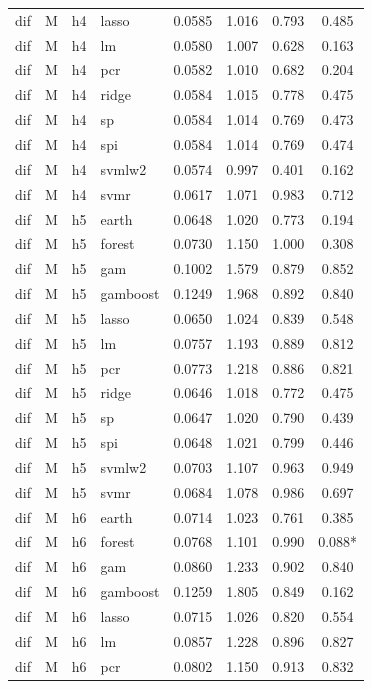 \begin{ThreePartTable}
\begin{longtable}[t]{llclcccc}
dif & M & h4 & lasso & 0.0585 & 1.016 & 0.793 & 0.485\\
dif & M & h4 & lm & 0.0580 & 1.007 & 0.628 & 0.163\\
dif & M & h4 & pcr & 0.0582 & 1.010 & 0.682 & 0.204\\
dif & M & h4 & ridge & 0.0584 & 1.015 & 0.778 & 0.475\\
dif & M & h4 & sp & 0.0584 & 1.014 & 0.769 & 0.473\\
dif & M & h4 & spi & 0.0584 & 1.014 & 0.769 & 0.474\\
dif & M & h4 & svmlw2 & 0.0574 & 0.997 & 0.401 & 0.162\\
dif & M & h4 & svmr & 0.0617 & 1.071 & 0.983 & 0.712\\
\addlinespace
dif & M & h5 & earth & 0.0648 & 1.020 & 0.773 & 0.194\\
dif & M & h5 & forest & 0.0730 & 1.150 & 1.000 & 0.308\\
dif & M & h5 & gam & 0.1002 & 1.579 & 0.879 & 0.852\\
dif & M & h5 & gamboost & 0.1249 & 1.968 & 0.892 & 0.840\\
dif & M & h5 & lasso & 0.0650 & 1.024 & 0.839 & 0.548\\
dif & M & h5 & lm & 0.0757 & 1.193 & 0.889 & 0.812\\
dif & M & h5 & pcr & 0.0773 & 1.218 & 0.886 & 0.821\\
dif & M & h5 & ridge & 0.0646 & 1.018 & 0.772 & 0.475\\
dif & M & h5 & sp & 0.0647 & 1.020 & 0.790 & 0.439\\
dif & M & h5 & spi & 0.0648 & 1.021 & 0.799 & 0.446\\
dif & M & h5 & svmlw2 & 0.0703 & 1.107 & 0.963 & 0.949\\
dif & M & h5 & svmr & 0.0684 & 1.078 & 0.986 & 0.697\\
\addlinespace
dif & M & h6 & earth & 0.0714 & 1.023 & 0.761 & 0.385\\
dif & M & h6 & forest & 0.0768 & 1.101 & 0.990 & 0.088*\\
dif & M & h6 & gam & 0.0860 & 1.233 & 0.902 & 0.840\\
dif & M & h6 & gamboost & 0.1259 & 1.805 & 0.849 & 0.162\\
dif & M & h6 & lasso & 0.0715 & 1.026 & 0.820 & 0.554\\
dif & M & h6 & lm & 0.0857 & 1.228 & 0.896 & 0.827\\
dif & M & h6 & pcr & 0.0802 & 1.150 & 0.913 & 0.832\\

\end{longtable}
\end{ThreePartTable}
